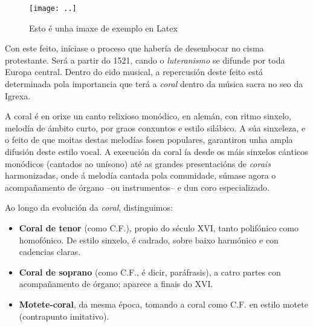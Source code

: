 \begin{figure}[h] %
    \caption{Esto é unha imaxe de exemplo en Latex}
    \centering
    \texttt{[image: ..]}
\end{figure}


\begin{multicols}{2}
    
Con este feito, iníciase o proceso que habería de desembocar no cisma protestante. Será a partir do 1521, cando o \emph{luteranismo} se difunde por toda Europa central. Dentro do eido musical, a repercusión deste feito está determinada pola importancia que terá a \emph{coral} dentro da música sacra no seo da Igrexa.

A coral é en orixe un canto relixioso monódico, en alemán, con ritmo sinxelo, melodía de ámbito curto, por graos conxuntos e estilo silábico. A súa sinxeleza, e o feito de que moitas destas melodías fosen populares, garantiron unha ampla difusión deste estilo vocal. A execución da coral ía desde os máis sinxelos cánticos monódicos (cantados ao unísono) até as grandes presentacións de \emph{corais} harmonizadas, onde á melodía cantada pola comunidade, súmase agora o acompañamento de órgano --ou instrumentos-- e dun coro especializado.

Ao longo da evolución da \emph{coral}, distinguimos:

    \begin{itemize}
        \item 
        \textbf{Coral de tenor} (como C.F.), propio do século XVI, tanto polifónico como homofónico. De estilo sinxelo, é cadrado, sobre baixo harmónico e con cadencias claras.
        \item
        \textbf{Coral de soprano} (como C.F., é dicir, paráfrasis), a catro partes con acompañamento de órgano; aparece a finais do XVI.
        \item
        \textbf{Motete-coral}, da mesma época, tomando a coral como C.F. en estilo motete (contrapunto imitativo).
    \end{itemize}
\end{multicols}